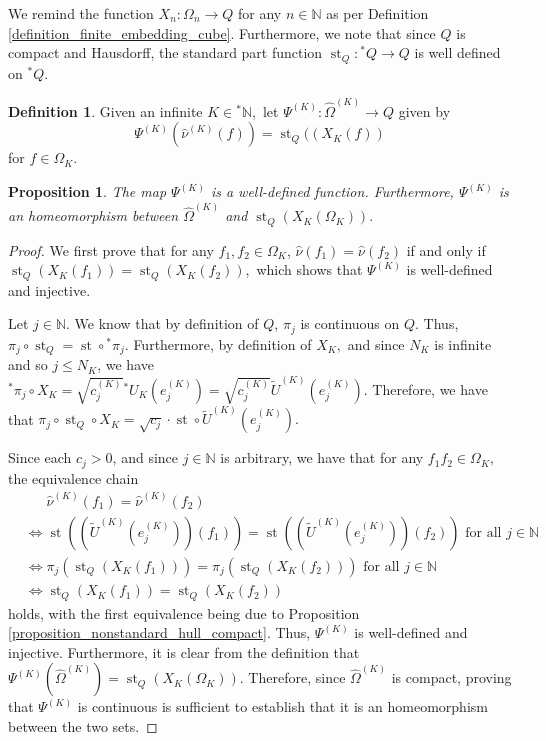 \documentclass{amsart}
\newtheorem{prop}[thm]{Proposition}
\theoremstyle{definition}
\newtheorem{definition}[thm]{Definition}
\theoremstyle{remark}
\def \St{\operatorname{st}}
\def \HOM{\hat{\Omega}}
\def \HNU{\hat{\nu}}
\begin{document}
We remind the function $X_n:\Omega_n\rightarrow Q$ for any $n\in\mathbb{N}$ as per Definition \ref{definition_finite_embedding_cube}. Furthermore, we note that since $Q$ is compact and Hausdorff, the standard part function $\St_Q:{}^*Q\rightarrow Q$ is well defined on ${}^*Q$.

\begin{definition}
	Given an infinite $K\in{}^*\mathbb{N},$ let $\Psi^{(K)}:\HOM^{(K)}\rightarrow Q$ given by $$\Psi^{(K)}(\HNU^{(K)}(f))=\St_Q((X_K(f))$$ for $f\in\Omega_K.$
\end{definition}
\begin{prop}
	The map $\Psi^{(K)}$ is a well-defined function. Furthermore, $\Psi^{(K)}$ is an homeomorphism between $\HOM^{(K)}$ and $\St_Q\left(X_K(\Omega_K)\right).$
\end{prop}
\begin{proof}
	We first prove that for any $f_1,f_2\in\Omega_K$, $\HNU(f_1)=\HNU(f_2)$ if and only if $\St_Q(X_K(f_1))=\St_Q(X_K(f_2)),$ which shows that $\Psi^{(K)}$ is well-defined and injective. %
	
	Let $j\in\mathbb{N}$. We know that by definition of $Q$, $\pi_j$ is continuous on $Q$. Thus, $\pi_j\circ \St_Q=\St\circ{}^*\pi_j.$ Furthermore, by definition of $X_K,$ and since $N_K$ is infinite and so $j\leq N_K$, we have ${}^*\pi_j\circ X_K=\sqrt{c_j^{(K)}}{}^*U_K(e_j^{(K)})=\sqrt{c_j^{(K)}}\tilde{U}^{(K)}(e_j^{(K)}).$ Therefore, we have that $\pi_j\circ \St_Q\circ X_K=\sqrt{c_j}\cdot\St\circ \tilde{U}^{(K)}(e_j^{(K)}).$ 
	
	Since each $c_j>0$, and since $j\in\mathbb{N}$ is arbitrary, we have that for any $f_1 f_2\in\Omega_K,$ the equivalence chain
	\begin{align*}
		&\phantom{{}\iff{}} \HNU^{(K)}(f_1)=\HNU^{(K)}(f_2)\\
		 &\iff \St((\tilde{U}^{(K)}(e_j^{(K)}))(f_1))=\St((\tilde{U}^{(K)}(e_j^{(K)}))(f_2)) \text{ for all $j\in\mathbb{N}$ }\\
		 &\iff \pi_j(\St_Q(X_K(f_1)))=\pi_j(\St_Q(X_K(f_2)))\text{ for all $j\in\mathbb{N}$ }\\
		 &\iff \St_Q(X_K(f_1))=\St_Q(X_K(f_2))
	\end{align*}
	holds, with the first equivalence being due to Proposition  \ref{proposition_nonstandard_hull_compact}. Thus, $\Psi^{(K)}$ is well-defined and injective. Furthermore, it is clear from the definition that $\Psi^{(K)}(\HOM^{(K)})=\St_Q(X_K(\Omega_K)).$ Therefore, since $\HOM^{(K)}$ is compact, proving that $\Psi^{(K)}$ is continuous is sufficient to establish that it is an homeomorphism between the two sets.%
	

\end{proof}
\end{document}
